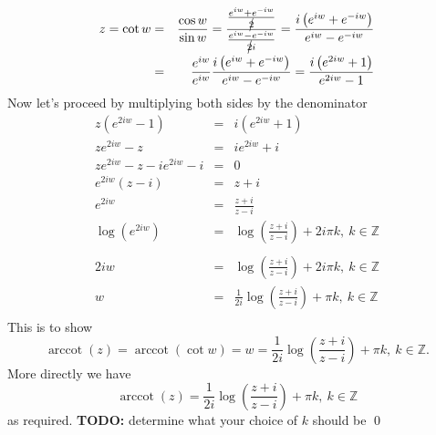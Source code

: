 \documentclass[10pt]{amsart}
\theoremstyle{nonumberplain}
\begin{document}
\begin{enumerate}[label={\bf {\arabic*}:}]
\begin{eqnarray*}
z = \cot w &=& \frac{\cos w}{\sin w} = \frac{ \frac{e^{iw} + e^{-iw}}{\cancel{2}} }{ \frac{e^{iw} - e^{-iw}}{\cancel{2}i} } = \frac{ i\left(e^{iw} + e^{-iw} \right)}{ e^{iw} - e^{-iw} } \\
	  &=& \frac{e^{iw}}{e^{iw}} \frac{ i\left(e^{iw} + e^{-iw} \right)}{ e^{iw} - e^{-iw} } = \frac{ i\left(e^{2iw} + 1 \right)}{ e^{2iw} - 1 }
\end{eqnarray*}
Now let's proceed by multiplying both sides by the denominator
\begin{eqnarray*}
z(e^{2iw} - 1) &=& i\left(e^{2iw} + 1 \right) \\
ze^{2iw} - z &=& ie^{2iw} + i \\
ze^{2iw} - z - ie^{2iw} - i &=& 0 \\
e^{2iw}(z - i) &=& z + i \\ 
e^{2iw} &=& \frac{z + i}{z - i} \\
\log \left(e^{2iw}\right) &=& \log \left(\frac{z + i}{z - i} \right) + 2i\pi k, \: k \in \mathbb{Z} \\ \\
2iw &=& \log \left(\frac{z + i}{z - i} \right) + 2i\pi k, \: k \in \mathbb{Z} \\
w &=& \frac{1}{2i}\log \left(\frac{z + i}{z - i} \right) + \pi k, \: k \in \mathbb{Z} \\
\end{eqnarray*}
This is to show
$$\operatorname{arccot}(z) = \operatorname{arccot}(\cot w) = w = \frac{1}{2i}\log \left(\frac{z + i}{z - i} \right) + \pi k, \: k \in \mathbb{Z}.$$
More directly we have 
$$ \operatorname{arccot}(z) = \frac{1}{2i}\log \left(\frac{z + i}{z - i} \right) + \pi k, \: k \in \mathbb{Z}$$
as required. 
\textbf{TODO:} determine what your choice of $k$ should be \qed \\


\end{enumerate}
\end{document}

